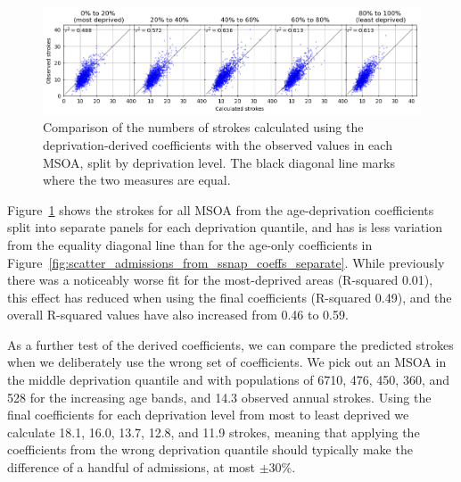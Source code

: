 \documentclass[12pt]{extarticle}
\begin{document}
\begin{figure}
    \centering
    \includegraphics[width=1.0\linewidth]{images/admissions_prediction_comparison_separate_1row.png}
    \caption{Comparison of the numbers of strokes calculated using the deprivation-derived coefficients with the observed values in each MSOA, split by deprivation level. The black diagonal line marks where the two measures are equal.}
    \label{fig:admissions_prediction_comparison_separate}
\end{figure}


Figure~\ref{fig:admissions_prediction_comparison_separate} shows the strokes for all MSOA from the age-deprivation coefficients split into separate panels for each deprivation quantile, and has is less variation from the equality diagonal line than for the age-only coefficients in Figure~\ref{fig:scatter_admissions_from_ssnap_coeffs_separate}.
While previously there was a noticeably worse fit for the most-deprived areas (R-squared 0.01), this effect has reduced when using the final coefficients (R-squared 0.49), and the overall R-squared values have also increased from 0.46 to 0.59.

As a further test of the derived coefficients, we can compare the predicted strokes when we deliberately use the wrong set of coefficients.
We pick out an MSOA in the middle deprivation quantile and with populations of 6710, 476, 450, 360, and 528 for the increasing age bands, and 14.3 observed annual strokes.
Using the final coefficients for each deprivation level from most to least deprived we calculate 18.1, 16.0, 13.7, 12.8, and 11.9 strokes,
meaning that applying the coefficients from the wrong deprivation quantile should typically make the difference of a handful of admissions, at most $\pm$30\%. 
\end{document}
